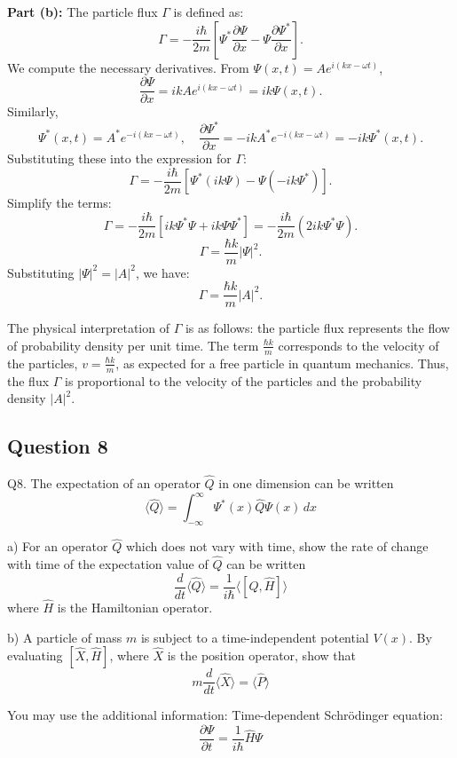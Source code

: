 \documentclass{article}
\begin{document}
\textbf{Part (b):}  
The particle flux $\Gamma$ is defined as:  
\[
\Gamma = -\frac{i\hbar}{2m} \left[ \Psi^* \frac{\partial \Psi}{\partial x} - \Psi \frac{\partial \Psi^*}{\partial x} \right].
\]
We compute the necessary derivatives. From $\Psi(x,t) = A e^{i(kx - \omega t)}$,  
\[
\frac{\partial \Psi}{\partial x} = i k A e^{i(kx - \omega t)} = i k \Psi(x,t).
\]
Similarly,  
\[
\Psi^*(x,t) = A^* e^{-i(kx - \omega t)}, \quad \frac{\partial \Psi^*}{\partial x} = -i k A^* e^{-i(kx - \omega t)} = -i k \Psi^*(x,t).
\]
Substituting these into the expression for $\Gamma$:  
\[
\Gamma = -\frac{i\hbar}{2m} \left[ \Psi^* (i k \Psi) - \Psi (-i k \Psi^*) \right].
\]
Simplify the terms:  
\[
\Gamma = -\frac{i\hbar}{2m} \left[ i k \Psi^* \Psi + i k \Psi \Psi^* \right] = -\frac{i\hbar}{2m} (2 i k \Psi^* \Psi).
\]
\[
\Gamma = \frac{\hbar k}{m} |\Psi|^2.
\]
Substituting $|\Psi|^2 = |A|^2$, we have:  
\[
\Gamma = \frac{\hbar k}{m} |A|^2.
\]

The physical interpretation of $\Gamma$ is as follows: the particle flux represents the flow of probability density per unit time. The term $\frac{\hbar k}{m}$ corresponds to the velocity of the particles, $v = \frac{\hbar k}{m}$, as expected for a free particle in quantum mechanics. Thus, the flux $\Gamma$ is proportional to the velocity of the particles and the probability density $|A|^2$.


\subsection{Question 8}
Q8.  
The expectation of an operator $\hat{Q}$ in one dimension can be written  
\[
\langle \hat{Q} \rangle = \int_{-\infty}^{\infty} \Psi^*(x) \hat{Q} \Psi(x) \, dx
\]

a) For an operator $\hat{Q}$ which does not vary with time, show the rate of change with time of the expectation value of $\hat{Q}$ can be written  
\[
\frac{d}{dt} \langle \hat{Q} \rangle = \frac{1}{i\hbar} \langle [\hat{Q}, \hat{H}] \rangle
\]  
where $\hat{H}$ is the Hamiltonian operator.

b) A particle of mass $m$ is subject to a time-independent potential $V(x)$. By evaluating $[\hat{X}, \hat{H}]$, where $\hat{X}$ is the position operator, show that  
\[
m \frac{d}{dt} \langle \hat{X} \rangle = \langle \hat{P} \rangle
\]

You may use the additional information:  
Time-dependent Schrödinger equation:  
\[
\frac{\partial \Psi}{\partial t} = \frac{1}{i\hbar} \hat{H} \Psi
\]
\end{document}
